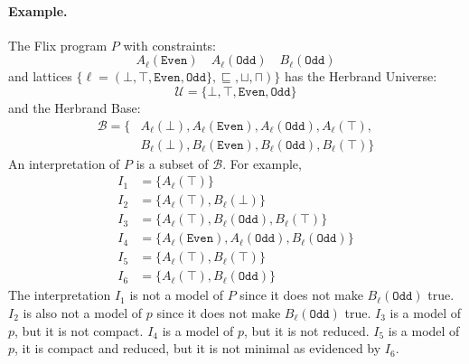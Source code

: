 \documentclass[10pt,twocolumn]{article}
\begin{document}
\paragraph{Example.}
The Flix program $P$ with constraints:
\[
    A_\ell(\texttt{Even}) \quad A_\ell(\texttt{Odd}) \quad B_\ell(\texttt{Odd})
\]
and lattices $\{ \ell = (\bot, \top, \texttt{Even}, \texttt{Odd}\}, \sqsubseteq, \sqcup, \sqcap) \}$ has
the Herbrand Universe:
%
\[
    \mathcal{U} = \{\bot, \top, \texttt{Even}, \texttt{Odd}\}
\]
%
and the Herbrand Base: 
%
\begin{align*}
    \mathcal{B} = \{ & A_\ell(\bot), A_\ell(\texttt{Even}), A_\ell(\texttt{Odd}), A_\ell(\top), \\
                     & B_\ell(\bot), B_\ell(\texttt{Even}), B_\ell(\texttt{Odd}), B_\ell(\top) \}
\end{align*}
%
An interpretation of $P$ is a subset of $\mathcal{B}$.
For example,
%
\begin{align*}
    I_1 & = \{ A_\ell(\top) \} \\
    I_2 & = \{ A_\ell(\top), B_\ell(\bot) \} \\
    I_3 & = \{ A_\ell(\top), B_\ell(\texttt{Odd}), B_\ell(\top) \} \\
    I_4 & = \{ A_\ell(\texttt{Even}), A_\ell(\texttt{Odd}), B_\ell(\texttt{Odd}) \} \\
    I_5 & = \{ A_\ell(\top), B_\ell(\top) \} \\
    I_6 & = \{ A_\ell(\top), B_\ell(\texttt{Odd}) \}
\end{align*}
%
The interpretation 
$I_1$ is not a model of $P$ since it does not make $B_\ell(\texttt{Odd})$ true.
$I_2$ is also not a model of $p$ since it does not make $B_\ell(\texttt{Odd})$ true.
$I_3$ is a model of $p$, but it is not compact.
$I_4$ is a model of $p$, but it is not reduced.
$I_5$ is a model of $p$, it is compact and reduced, but it is not minimal as evidenced by $I_6$.
\end{document}
